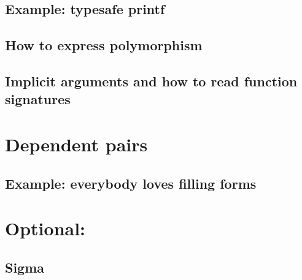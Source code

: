 \documentclass{beamer}
\begin{document}

\subsection{Example: typesafe printf}

\subsection{How to express polymorphism}

\subsection{Implicit arguments and how to read function signatures}

\section{Dependent pairs}

\subsection{Example: everybody loves filling forms}

\section{Optional: }

\subsection{Sigma}
\end{document}
